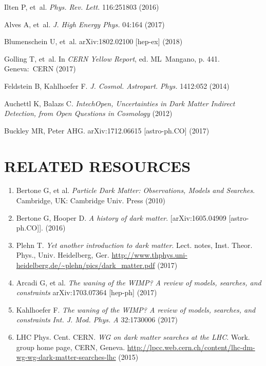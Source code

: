 \documentclass{ar-1col}
\begin{document}
\begin{thebibliography}{175}
Ilten P, et~al. \textit{Phys. Rev. Lett.} 116:251803 (2016)

Alves A, et~al. \textit{J. High Energy Phys.} 04:164 (2017)

Blumenschein U, et~al. arXiv:1802.02100 [hep-ex] (2018)

Golling T, et~al. In \textit{CERN Yellow Report}, ed. ML\ Mangano, p. 441. Geneva:\ CERN (2017)

Feldstein B, Kahlhoefer F. \textit{J. Cosmol. Astropart. Phys.} 1412:052 (2014)

Auchettl K, Balazs C. \textit{IntechOpen, Uncertainties in Dark Matter Indirect Detection, from Open Questions in Cosmology} (2012)

Buckley MR, Peter AHG. arXiv:1712.06615 [astro-ph.CO] (2017)

\end{thebibliography}

\section*{RELATED RESOURCES}
\begin{enumerate}
\item Bertone G, et al. \textit{Particle Dark Matter: Observations, Models and Searches}. Cambridge, UK: Cambridge Univ. Press (2010)%

\item Bertone G, Hooper D. \textit{A history of dark matter}. [arXiv:1605.04909 [astro-ph.CO]]. (2016)

\item Plehn T. \textit{Yet another introduction to dark matter}. Lect. notes, Inst. Theor. Phys., Univ. Heidelberg, Ger. \url{http://www.thphys.uni-heidelberg.de/~plehn/pics/dark_matter.pdf} (2017)

\item Arcadi G, et al. \textit{The waning of the WIMP? A review of models, searches, and constraints} {arXiv:1703.07364 [hep-ph]} (2017)

\item Kahlhoefer F. \textit{The waning of the WIMP? A review of models, searches, and constraints} \textit{Int. J. Mod. Phys. A} 32:1730006 (2017)

\item {LHC Phys. Cent. CERN.\textit{ WG on dark matter searches at the LHC}. Work. group home page, CERN, Geneva.} \url{http://lpcc.web.cern.ch/content/lhc-dm-wg-wg-dark-matter-searches-lhc} (2015)

\end{enumerate}
\end{document}
